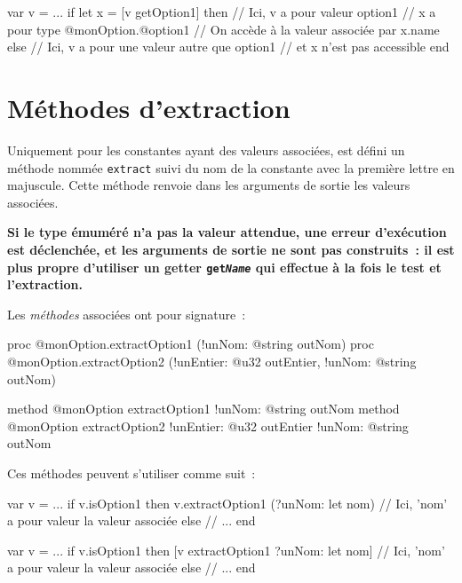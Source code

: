 \begin{galgas4}
var v = ...
if let x = [v getOption1] then
  // Ici, v a pour valeur option1
  // x a pour type @monOption.@option1
  // On accède à la valeur associée par x.name
else
  // Ici, v a pour une valeur autre que option1
  // et x n'est pas accessible
end
\end{galgas4}












\section{Méthodes d'extraction}

Uniquement pour les constantes ayant des valeurs associées, est défini un méthode nommée \texttt{extract} suivi du nom  de la constante avec la première lettre en majuscule. Cette méthode renvoie dans les arguments de sortie les valeurs associées.

{\bf Si le type émuméré n'a pas la valeur attendue, une erreur d'exécution est déclenchée, et les arguments de sortie ne sont pas construits~: il est plus propre d'utiliser un getter \texttt{get\emph{Name}} qui effectue à la fois le test et l'extraction.}


Les \emph{méthodes} associées ont pour signature~:
\begin{galgas4}
proc @monOption.extractOption1 (!unNom: @string outNom)
proc @monOption.extractOption2 (!unEntier: @u32 outEntier, !unNom: @string outNom)
\end{galgas4}
\begin{galgas4}
method @monOption extractOption1 !unNom: @string outNom
method @monOption extractOption2 !unEntier: @u32 outEntier !unNom: @string outNom
\end{galgas4}

Ces méthodes peuvent s'utiliser comme suit~:
\begin{galgas4}
var v = ...
if v.isOption1 then
  v.extractOption1 (?unNom: let nom)
  // Ici, 'nom' a pour valeur la valeur associée
else
  // ...
end
\end{galgas4}

\begin{galgas4}
var v = ...
if v.isOption1 then
  [v extractOption1 ?unNom: let nom]
  // Ici, 'nom' a pour valeur la valeur associée
else
  // ...
end
\end{galgas4}













